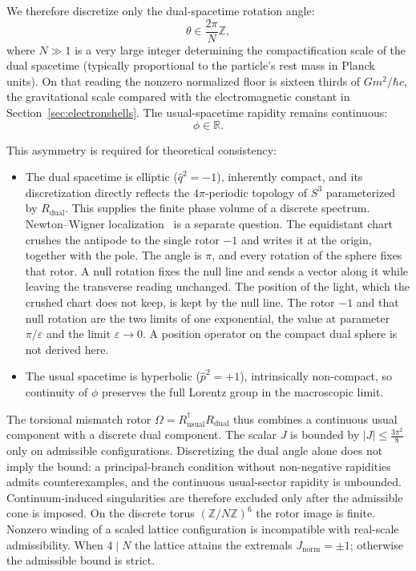 \documentclass[a4paper]{article}
\newcommand{\Jnorm}{J_{\mathrm{norm}}}
\newcommand{\Jbound}{\frac{3\pi^2}{8}}
\begin{document}
We therefore discretize only the dual-spacetime rotation angle:
\[
\theta \in \frac{2\pi}{N} \mathbb{Z},
\]
where $N \gg 1$ is a very large integer determining the compactification scale of the dual spacetime (typically proportional to the particle’s rest mass in Planck units). On that reading the nonzero normalized floor is sixteen thirds of \(G m^2/\hbar c\), the gravitational scale compared with the electromagnetic constant in Section~\ref{sec:electronshells}. The usual-spacetime rapidity remains continuous:
\[
\phi \in \mathbb{R}.
\]

This asymmetry is required for theoretical consistency:
\begin{itemize}
  \item The dual spacetime is elliptic ($\hat{q}^2 = -1$), inherently compact, and its discretization directly reflects the $4\pi$-periodic topology of $S^3$ parameterized by $R_{\text{dual}}$. This supplies the finite phase volume of a discrete spectrum. Newton–Wigner localization~\cite{newtonwigner1949} is a separate question. The equidistant chart crushes the antipode to the single rotor $-1$ and writes it at the origin, together with the pole. The angle is $\pi$, and every rotation of the sphere fixes that rotor. A null rotation fixes the null line and sends a vector along it while leaving the transverse reading unchanged. The position of the light, which the crushed chart does not keep, is kept by the null line. The rotor $-1$ and that null rotation are the two limits of one exponential, the value at parameter $\pi/\varepsilon$ and the limit $\varepsilon\to 0$. A position operator on the compact dual sphere is not derived here.
  \item The usual spacetime is hyperbolic ($\hat{p}^2 = +1$), intrinsically non-compact, so continuity of $\phi$ preserves the full Lorentz group in the macroscopic limit.
\end{itemize}

The torsional mismatch rotor $\Omega = R_{\text{usual}}^\dagger R_{\text{dual}}$ thus combines a continuous usual component with a discrete dual component. The scalar $J$ is bounded by $|J|\le\Jbound$ only on admissible configurations. Discretizing the dual angle alone does not imply the bound: a principal-branch condition without non-negative rapidities admits counterexamples, and the continuous usual-sector rapidity is unbounded. Continuum-induced singularities are therefore excluded only after the admissible cone is imposed. On the discrete torus $(\mathbb{Z}/N\mathbb{Z})^6$ the rotor image is finite. Nonzero winding of a scaled lattice configuration is incompatible with real-scale admissibility. When $4\mid N$ the lattice attains the extremals $\Jnorm=\pm 1$; otherwise the admissible bound is strict.
\end{document}
